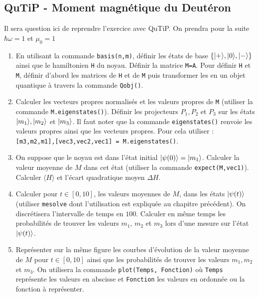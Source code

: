 \subsection{QuTiP - Moment magnétique du Deutéron}
Il sera question ici de reprendre l'exercice avec QuTiP. On prendra pour la suite $\hbar\omega=1$ et $\mu_0=1$
\begin{enumerate}
\item En utilisant la commande \texttt{basis(n,m)}, définir les états de base $\{\vert+\rangle,\vert0\rangle,\vert-\rangle\}$ ainsi que le hamiltonien \texttt{H} du noyau. Définir la matrice \texttt{M=A}. Pour définir \texttt{H} et \texttt{M}, définir d'abord les matrices de \texttt{H} et de \texttt{M} puis transformer les en un objet quantique à travers la commande \texttt{Qobj()}.

\item Calculer les vecteurs propres normalisés et les valeurs propres de \texttt{M} (utiliser la commande \texttt{M.eigenstates()}). Définir les projecteurs \texttt{$P_1,P_2$} et $P_3$ sur les états $\vert m_1\rangle,\vert m_2\rangle$ et $\vert m_3\rangle$. Il faut noter que la commande \texttt{eigenstates()} renvoie les valeurs propres ainsi que les vecteurs propres. Pour cela utiliser :\\
\texttt{[m3,m2,m1],[vec3,vec2,vec1] = M.eigenstates()}.

\item On suppose que le noyau est dans l'état initial $\vert\psi(0)\rangle=\vert m_1\rangle$. Calculer la valeur moyenne de $M$ dans cet état (utiliser la commande \texttt{expect(M,vec1)}). Calculer $\langle H\rangle$ et l'écart quadratique moyen $\Delta H$.

\item Calculer pour $t\in[0,10]$, les valeurs moyennes de $M$, dans les états $\vert\psi(t)\rangle$ (utiliser \texttt{mesolve} dont l'utilisation est expliquée au chapitre précédent). On discrétisera l'intervalle de temps en $100$. Calculer en même temps les probabilités de trouver les valeurs $m_1$, $m_2$ et $m_3$ lors d'une mesure sur l'état $\vert\psi(t)\rangle$.

\item Représenter sur la même figure les courbes d'évolution de la valeur moyenne de $M$ pour $t\in[0,10]$ ainsi que les probabilités de trouver les valeurs $m_1,m_2$ et $m_3$. On utilisera la commande \texttt{plot(Temps, Fonction)} où \texttt{Temps} représente les valeurs en abscisse et \texttt{Fonction} les valeurs en ordonnée ou la fonction à représenter.
\end{enumerate}

